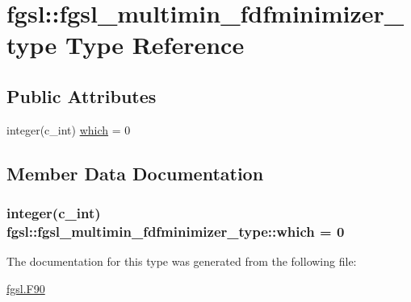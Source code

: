 \hypertarget{structfgsl_1_1fgsl__multimin__fdfminimizer__type}{}\section{fgsl\+:\+:fgsl\+\_\+multimin\+\_\+fdfminimizer\+\_\+type Type Reference}
\label{structfgsl_1_1fgsl__multimin__fdfminimizer__type}
\subsection*{Public Attributes}
\begin{DoxyCompactItemize}
\item 
integer(c\+\_\+int) \hyperlink{structfgsl_1_1fgsl__multimin__fdfminimizer__type_acffe581bd4f5cee270a5c8baa5f88653}{which} = 0
\end{DoxyCompactItemize}


\subsection{Member Data Documentation}
\hypertarget{structfgsl_1_1fgsl__multimin__fdfminimizer__type_acffe581bd4f5cee270a5c8baa5f88653}{}
\subsubsection[{which}]{\setlength{\rightskip}{0pt plus 5cm}integer(c\+\_\+int) fgsl\+::fgsl\+\_\+multimin\+\_\+fdfminimizer\+\_\+type\+::which = 0}\label{structfgsl_1_1fgsl__multimin__fdfminimizer__type_acffe581bd4f5cee270a5c8baa5f88653}


The documentation for this type was generated from the following file\+:\begin{DoxyCompactItemize}
\item 
\hyperlink{fgsl_8F90}{fgsl.\+F90}\end{DoxyCompactItemize}
